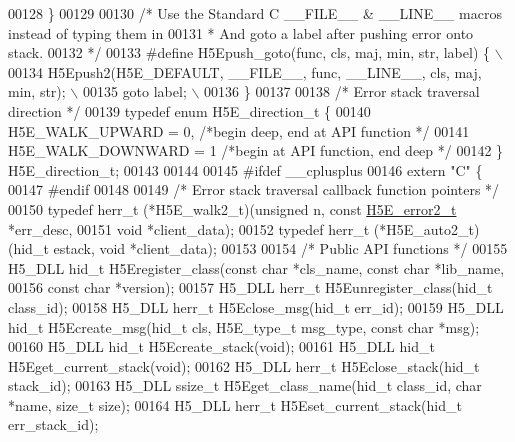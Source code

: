 \begin{DoxyCode}
00128 \textcolor{preprocessor}{\}}
00129 
00130 \textcolor{comment}{/* Use the Standard C \_\_FILE\_\_ & \_\_LINE\_\_ macros instead of typing them in}
00131 \textcolor{comment}{ * And goto a label after pushing error onto stack.}
00132 \textcolor{comment}{ */}
00133 \textcolor{preprocessor}{#define H5Epush\_goto(func, cls, maj, min, str, label) \{               \(\backslash\)}
00134 \textcolor{preprocessor}{    H5Epush2(H5E\_DEFAULT, \_\_FILE\_\_, func, \_\_LINE\_\_, cls, maj, min, str);      \(\backslash\)}
00135 \textcolor{preprocessor}{    goto label;                                   \(\backslash\)}
00136 \textcolor{preprocessor}{\}}
00137 
00138 \textcolor{comment}{/* Error stack traversal direction */}
00139 \textcolor{keyword}{typedef} \textcolor{keyword}{enum} H5E\_direction\_t \{
00140     H5E\_WALK\_UPWARD = 0,        \textcolor{comment}{/*begin deep, end at API function    */}
00141     H5E\_WALK\_DOWNWARD   = 1     \textcolor{comment}{/*begin at API function, end deep    */}
00142 \} H5E\_direction\_t;
00143 
00144 
00145 \textcolor{preprocessor}{#ifdef \_\_cplusplus}
00146 \textcolor{keyword}{extern} \textcolor{stringliteral}{"C"} \{
00147 \textcolor{preprocessor}{#endif}
00148 
00149 \textcolor{comment}{/* Error stack traversal callback function pointers */}
00150 \textcolor{keyword}{typedef} herr\_t (*H5E\_walk2\_t)(\textcolor{keywordtype}{unsigned} n, \textcolor{keyword}{const} \hyperlink{struct_h5_e__error2__t}{H5E\_error2\_t} *err\_desc,
00151     \textcolor{keywordtype}{void} *client\_data);
00152 \textcolor{keyword}{typedef} herr\_t (*H5E\_auto2\_t)(hid\_t estack, \textcolor{keywordtype}{void} *client\_data);
00153 
00154 \textcolor{comment}{/* Public API functions */}
00155 H5\_DLL hid\_t  H5Eregister\_class(\textcolor{keyword}{const} \textcolor{keywordtype}{char} *cls\_name, \textcolor{keyword}{const} \textcolor{keywordtype}{char} *lib\_name,
00156     \textcolor{keyword}{const} \textcolor{keywordtype}{char} *version);
00157 H5\_DLL herr\_t H5Eunregister\_class(hid\_t class\_id);
00158 H5\_DLL herr\_t H5Eclose\_msg(hid\_t err\_id);
00159 H5\_DLL hid\_t  H5Ecreate\_msg(hid\_t cls, H5E\_type\_t msg\_type, \textcolor{keyword}{const} \textcolor{keywordtype}{char} *msg);
00160 H5\_DLL hid\_t  H5Ecreate\_stack(\textcolor{keywordtype}{void});
00161 H5\_DLL hid\_t  H5Eget\_current\_stack(\textcolor{keywordtype}{void});
00162 H5\_DLL herr\_t H5Eclose\_stack(hid\_t stack\_id);
00163 H5\_DLL ssize\_t H5Eget\_class\_name(hid\_t class\_id, \textcolor{keywordtype}{char} *name, \textcolor{keywordtype}{size\_t} size);
00164 H5\_DLL herr\_t H5Eset\_current\_stack(hid\_t err\_stack\_id);

\end{DoxyCode}
